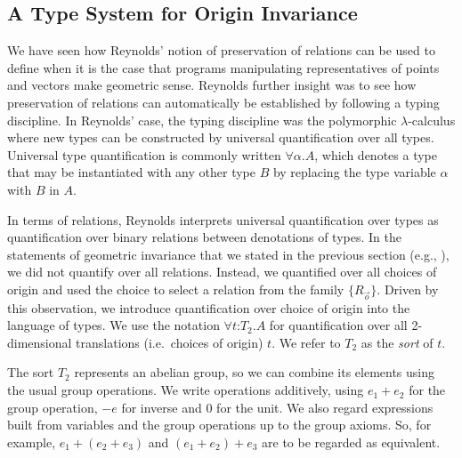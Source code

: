 
\subsection{A Type System for Origin Invariance}
\label{sec:type-system-geom-intro}

We have seen how Reynolds' notion of preservation of relations can be
used to define when it is the case that programs manipulating
representatives of points and vectors make geometric sense. Reynolds
further insight was to see how preservation of relations can
automatically be established by following a typing discipline. In
Reynolds' case, the typing discipline was the polymorphic
$\lambda$-calculus where new types can be constructed by universal
quantification over all types. Universal type quantification is
commonly written $\forall \alpha. A$, which denotes a type that may be
instantiated with any other type $B$ by replacing the type variable
$\alpha$ with $B$ in $A$.

In terms of relations, Reynolds interprets universal quantification
over types as quantification over binary relations between denotations
of types. In the statements of geometric invariance that we stated in
the previous section (e.g., ), we
did not quantify over all relations. Instead, we quantified over all
choices of origin and used the choice to select a relation from the
family $\{R_{\vec{o}}\}$. Driven by this observation, we introduce
quantification over choice of origin into the language of types.  We
use the notation $\forall t \mathord: T_2. A$ for quantification over
all 2-dimensional translations (i.e.~choices of origin) $t$. We refer
to $T_2$ as the \emph{sort} of $t$.


The sort $T_2$ represents an abelian group, so we can combine its
elements using the usual group operations. We write operations
additively, using $e_1 + e_2$ for the group operation, $-e$ for
inverse and $0$ for the unit.  We also regard expressions built from
variables and the group operations up to the group axioms. So, for
example, $e_1 + (e_2 + e_3)$ and $(e_1 + e_2) + e_3$ are to be
regarded as equivalent.

